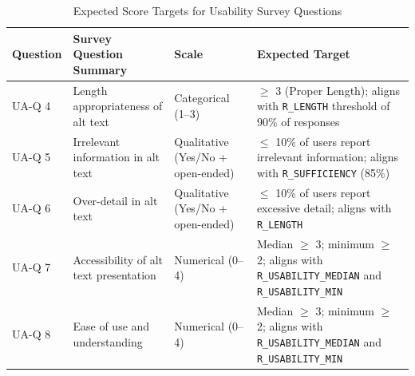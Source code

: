 \documentclass[12pt, titlepage]{article}
\begin{document}
\begin{table}[H]
  \centering
  \caption{Expected Score Targets for Usability Survey Questions}
  \label{tab:survey-targets}
  \begin{tabular}{p{2cm} p{5cm} p{3cm} p{4cm}}
    \toprule
    \textbf{Question} & \textbf{Survey Question Summary} & \textbf{Scale} & \textbf{Expected Target} \\
    \midrule
    UA-Q 4 & Length appropriateness of alt text & Categorical (1--3) & $\geq$ 3 (Proper Length); aligns with \texttt{R\_LENGTH} threshold of 90\% of responses \\
    \addlinespace
    UA-Q 5 & Irrelevant information in alt text & Qualitative (Yes/No + open-ended) & $\leq$ 10\% of users report irrelevant information; aligns with \texttt{R\_SUFFICIENCY} (85\%) \\
    \addlinespace
    UA-Q 6 & Over-detail in alt text & Qualitative (Yes/No + open-ended) & $\leq$ 10\% of users report excessive detail; aligns with \texttt{R\_LENGTH} \\
    \addlinespace
    UA-Q 7 & Accessibility of alt text presentation & Numerical (0--4) & Median $\geq$ 3; minimum $\geq$ 2; aligns with \texttt{R\_USABILITY\_MEDIAN} and \texttt{R\_USABILITY\_MIN} \\
    \addlinespace
    UA-Q 8 & Ease of use and understanding & Numerical (0--4) & Median $\geq$ 3; minimum $\geq$ 2; aligns with \texttt{R\_USABILITY\_MEDIAN} and \texttt{R\_USABILITY\_MIN} \\
    \bottomrule
  \end{tabular}
\end{table}
\end{document}
